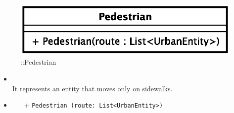 \begin{figure}[h]
\centering
\includegraphics[scale=0.6,keepaspectratio]{images/solution/pedestrian.eps}
\caption{\pActive::Pedestrian}
\label{fig:sd-app-pedestrian}
\end{figure}
\FloatBarrier
\begin{itemize}
  \item \textbf{\descr} \\
It represents an entity that moves only on sidewalks.
\item \textbf{\ops}
  \begin{itemize}
    \item[+] \texttt{Pedestrian (route: List<UrbanEntity>)}
  \end{itemize}
\end{itemize} 
